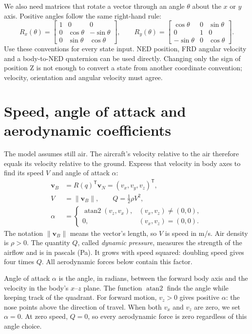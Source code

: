 \documentclass[11pt,a4paper]{article}
\numberwithin{equation}{section}
\newcommand{\vect}[1]{\boldsymbol{#1}}
\newcommand{\trans}{^{\mathsf T}}
\begin{document}
We also need matrices that rotate a vector through an angle $\theta$ about
the $x$ or $y$ axis. Positive angles follow the same right-hand rule:
\begin{equation}\label{eq:elementary}
 R_x(\theta)=\begin{bmatrix}
 1&0&0\\0&\cos\theta&-\sin\theta\\0&\sin\theta&\cos\theta
 \end{bmatrix},\qquad
 R_y(\theta)=\begin{bmatrix}
 \cos\theta&0&\sin\theta\\0&1&0\\-\sin\theta&0&\cos\theta
 \end{bmatrix}.
\end{equation}
Use these conventions for every state input. NED position, FRD angular
velocity and a body-to-NED quaternion can be used directly. Changing only
the sign of position Z is not enough to convert a state from another
coordinate convention; velocity, orientation and angular velocity must agree.

\section{Speed, angle of attack and aerodynamic coefficients}
The model assumes still air. The aircraft's velocity relative to the air
therefore equals its velocity relative to the ground. Express that velocity
in body axes to find its speed $V$ and angle of attack $\alpha$:
\begin{align}
 \vect v_B&=R(q)\trans\vect v_N=(v_x,v_y,v_z)\trans,\\
 V&=\|\vect v_B\|,\qquad Q=\tfrac12\rho V^2,\label{eq:pressure}\\
 \alpha&=\begin{cases}
   \operatorname{atan2}(v_z,v_x),&(v_x,v_z)\ne(0,0),\\
   0,&(v_x,v_z)=(0,0).
 \end{cases}\label{eq:alpha}
\end{align}
The notation $\|\vect v_B\|$ means the vector's length, so $V$ is speed
in m/s. Air density is $\rho>0$. The quantity $Q$, called \emph{dynamic
pressure}, measures the strength of the airflow and is in pascals (Pa).
It grows with speed squared: doubling speed gives four times $Q$.
All aerodynamic forces below contain this factor.

Angle of attack $\alpha$ is the angle, in radians, between the forward
body axis and the velocity in the body's $x$--$z$ plane.
The function $\operatorname{atan2}$ finds the angle while keeping track of
the quadrant. For forward motion, $v_z>0$ gives positive $\alpha$:
the nose points above the direction of travel. When both $v_x$ and $v_z$
are zero, we set $\alpha=0$. At zero speed, $Q=0$, so every aerodynamic
force is zero regardless of this angle choice.
\end{document}
